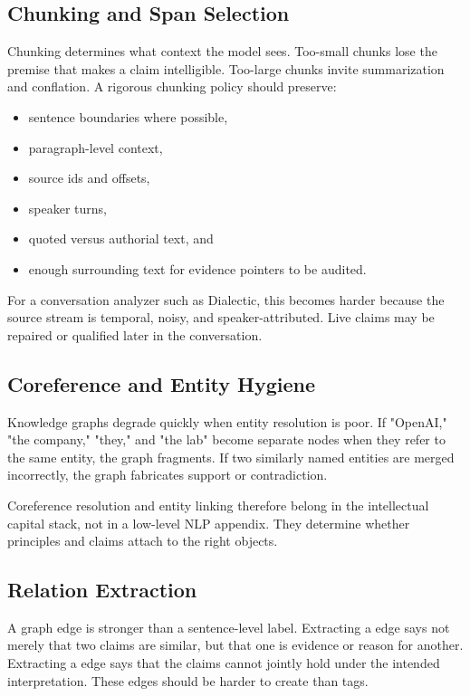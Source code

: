 \documentclass[11pt]{article}
\newcommand{\code}[1]{\texttt{\detokenize{#1}}}
\begin{document}
\subsection{Chunking and Span Selection}

Chunking determines what context the model sees. Too-small chunks lose the
premise that makes a claim intelligible. Too-large chunks invite summarization
and conflation. A rigorous chunking policy should preserve:

\begin{itemize}
\item sentence boundaries where possible,
\item paragraph-level context,
\item source ids and offsets,
\item speaker turns,
\item quoted versus authorial text, and
\item enough surrounding text for evidence pointers to be audited.
\end{itemize}

For a conversation analyzer such as Dialectic, this becomes harder because the
source stream is temporal, noisy, and speaker-attributed. Live claims may be
repaired or qualified later in the conversation.

\subsection{Coreference and Entity Hygiene}

Knowledge graphs degrade quickly when entity resolution is poor. If "OpenAI,"
"the company," "they," and "the lab" become separate nodes when they refer to
the same entity, the graph fragments. If two similarly named entities are
merged incorrectly, the graph fabricates support or contradiction.

Coreference resolution and entity linking therefore belong in the intellectual
capital stack, not in a low-level NLP appendix. They determine whether
principles and claims attach to the right objects.

\subsection{Relation Extraction}

A graph edge is stronger than a sentence-level label. Extracting a
\code{supports} edge says not merely that two claims are similar, but that one
is evidence or reason for another. Extracting a \code{contradicts} edge says
that the claims cannot jointly hold under the intended interpretation. These
edges should be harder to create than tags.
\end{document}

